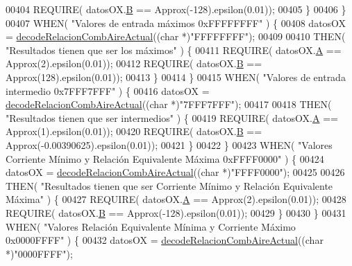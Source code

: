 \begin{DoxyCode}
{00404                 REQUIRE( datosOX.\hyperlink{structOxigenoResponse_a96b19152dd001e19d1351e2d97f22736}{B} == Approx(-128).epsilon(0.01));
00405             \}
00406         \}
00407         WHEN( \textcolor{stringliteral}{"Valores de entrada máximos 0xFFFFFFFF"} ) \{
00408             datosOX = \hyperlink{decoders_8cpp_a4cedb500095b25b3d4fff382094b0eb9}{decodeRelacionCombAireActual}((\textcolor{keywordtype}{char} *)\textcolor{stringliteral}{"FFFFFFFF"});
00409 
00410             THEN( \textcolor{stringliteral}{"Resultados tienen que ser los máximos"} ) \{
00411                 REQUIRE( datosOX.\hyperlink{structOxigenoResponse_a068c403e5746226cf22bb020b4c786d3}{A} == Approx(2).epsilon(0.01));
00412                 REQUIRE( datosOX.\hyperlink{structOxigenoResponse_a96b19152dd001e19d1351e2d97f22736}{B} == Approx(128).epsilon(0.01));
00413             \}
00414         \}
00415         WHEN( \textcolor{stringliteral}{"Valores de entrada intermedio 0x7FFF7FFF"} ) \{
00416             datosOX = \hyperlink{decoders_8cpp_a4cedb500095b25b3d4fff382094b0eb9}{decodeRelacionCombAireActual}((\textcolor{keywordtype}{char} *)\textcolor{stringliteral}{"7FFF7FFF"});
00417 
00418             THEN( \textcolor{stringliteral}{"Resultados tienen que ser intermedios"} ) \{
00419                 REQUIRE( datosOX.\hyperlink{structOxigenoResponse_a068c403e5746226cf22bb020b4c786d3}{A} == Approx(1).epsilon(0.01));
00420                 REQUIRE( datosOX.\hyperlink{structOxigenoResponse_a96b19152dd001e19d1351e2d97f22736}{B} == Approx(-0.00390625).epsilon(0.01));
00421             \}
00422         \}
00423         WHEN( \textcolor{stringliteral}{"Valores Corriente Mínimo y Relación Equivalente Máxima 0xFFFF0000"} ) \{
00424             datosOX = \hyperlink{decoders_8cpp_a4cedb500095b25b3d4fff382094b0eb9}{decodeRelacionCombAireActual}((\textcolor{keywordtype}{char} *)\textcolor{stringliteral}{"FFFF0000"});
00425 
00426             THEN( \textcolor{stringliteral}{"Resultados tienen que ser Corriente Mínimo y Relación Equivalente Máxima"} ) \{
00427                 REQUIRE( datosOX.\hyperlink{structOxigenoResponse_a068c403e5746226cf22bb020b4c786d3}{A} == Approx(2).epsilon(0.01));
00428                 REQUIRE( datosOX.\hyperlink{structOxigenoResponse_a96b19152dd001e19d1351e2d97f22736}{B} == Approx(-128).epsilon(0.01));
00429             \}
00430         \}
00431         WHEN( \textcolor{stringliteral}{"Valores Relación Equivalente Mínima y Corriente Máximo 0x0000FFFF"} ) \{
00432             datosOX = \hyperlink{decoders_8cpp_a4cedb500095b25b3d4fff382094b0eb9}{decodeRelacionCombAireActual}((\textcolor{keywordtype}{char} *)\textcolor{stringliteral}{"0000FFFF"});
}
\end{DoxyCode}
